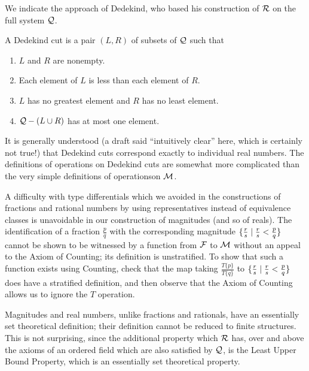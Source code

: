 We indicate the approach of Dedekind, who based his construction of
${\cal R}$ on the full system ${\cal Q}$.

\begin{definition}
 A {\upshape Dedekind cut} is a pair $(L,R)$ of subsets of ${\cal Q}$ such that 
 \begin{enumerate}
  \item $L$ and $R$ are nonempty.
  \item Each element of $L$ is less than each element of $R$.
  \item $L$ has no greatest element and $R$ has no least element.
  \item ${\cal Q}-(L \cup R)$ has at most one element.
\end{enumerate}
\end{definition}

It is generally understood (a draft said ``intuitively clear'' here,
which is certainly not true!) that Dedekind cuts correspond
exactly to individual real numbers.  The definitions of
operations on Dedekind cuts are somewhat more complicated than the very simple
definitions of operations\linebreak on ${\cal M}$.

A difficulty with type differentials which we avoided in the
constructions of fractions and
rational numbers by using representatives
instead of equivalence classes is unavoidable in our construction of
magnitudes (and so of reals).
The identification of a fraction $\frac pq$ with the corresponding
magnitude $\{\frac rs \mid \frac rs < \frac pq\}$ cannot be shown to
be witnessed by a function from ${\cal F}$ to ${\cal
M}$ without an appeal to the Axiom of Counting; its definition is unstratified.  To
show that such a function exists using Counting, check that the map
taking $\frac {T\{p\}}{T\{q\}}$ to $\{\frac rs \mid 
\frac rs < \frac pq\}$ does have a stratified definition,
and then observe that the Axiom of Counting allows us to ignore the $T$
operation.

Magnitudes and real numbers, unlike
fractions and rationals, have an 
essentially set theoretical definition; their definition cannot be
reduced to finite structures.  This is not surprising,
since the additional property which ${\cal R}$ has, over and above the axioms
of an ordered field which are also satisfied by ${\cal Q}$, is the Least
Upper Bound Property, which is an essentially set theoretical property.

